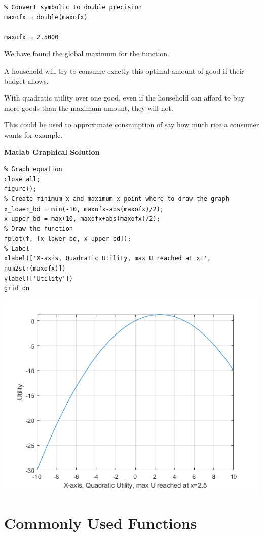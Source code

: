 \documentclass[
]{book}
\begin{document}
\begin{verbatim}
% Convert symbolic to double precision
maxofx = double(maxofx)

maxofx = 2.5000
\end{verbatim}

We have found the global maximum for the function.

A household will try to consume exactly this optimal amount of good if
their budget allows.

With quadratic utility over one good, even if the household can afford
to buy more goods than the maximum amount, they will not.

This could be used to approximate consumption of say how much rice a
consumer wants for example.

\textbf{Matlab Graphical Solution}

\begin{verbatim}
% Graph equation
close all;
figure();
% Create minimum x and maximum x point where to draw the graph
x_lower_bd = min(-10, maxofx-abs(maxofx)/2);
x_upper_bd = max(10, maxofx+abs(maxofx)/2);
% Draw the function
fplot(f, [x_lower_bd, x_upper_bd]);
% Label
xlabel(['X-axis, Quadratic Utility, max U reached at x=', num2str(maxofx)])
ylabel(['Utility'])
grid on
\end{verbatim}

\includegraphics[width=5.20833in,height=\textheight]{img/localglobal_images/figure_0.png}

\hypertarget{commonly-used-functions}{%
\chapter{Commonly Used Functions}\label{commonly-used-functions}}
\end{document}
